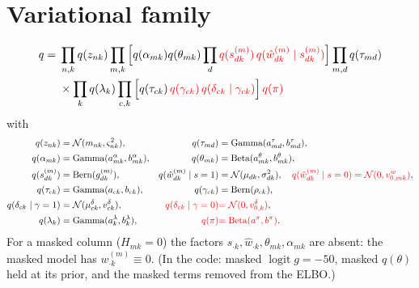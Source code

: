 \documentclass[11pt,a4paper]{article}
\newcommand{\new}[1]{{\color{red}#1}}
\newcommand{\N}{\mathcal{N}}
\newcommand{\Bern}{\mathrm{Bern}}
\newcommand{\Betad}{\mathrm{Beta}}
\newcommand{\Gam}{\mathrm{Gamma}}
\newcommand{\logit}{\operatorname{logit}}
\newcommand{\wh}{\hat w}
\theoremstyle{definition}
\theoremstyle{remark}
\begin{document}
\section{Variational family}\label{sec:q}
\begin{equation}\label{eq:q}
\begin{split}
q={}&\prod_{n,k}q(z_{nk})\prod_{m,k}\Big[q(\alpha_{mk})q(\theta_{mk})\prod_d \new{q(s^{(m)}_{dk})\,q(\wh^{(m)}_{dk}\mid s^{(m)}_{dk})}\Big]\prod_{m,d}q(\tau_{md})\\
&\times\prod_{k}q(\lambda_k)\prod_{c,k}\Big[q(\tau_{ck})\,\new{q(\gamma_{ck})\,q(\delta_{ck}\mid\gamma_{ck})}\Big]\,\new{q(\pi)}
\end{split}
\end{equation}
with
\begin{align*}
q(z_{nk})&=\N(m_{nk},\varsigma^2_{nk}), & q(\tau_{md})&=\Gam(a^\tau_{md},b^\tau_{md}),\\
q(\alpha_{mk})&=\Gam(a^\alpha_{mk},b^\alpha_{mk}), & q(\theta_{mk})&=\Betad(a^\theta_{mk},b^\theta_{mk}),\\
q(s^{(m)}_{dk})&=\Bern(g^{(m)}_{dk}), & q(\wh^{(m)}_{dk}\mid s=1)&=\N(\mu_{dk},\sigma^2_{dk}),\quad \new{q(\wh^{(m)}_{dk}\mid s=0)=\N(0,v^{w}_{0,mk})},\\
q(\tau_{ck})&=\Gam(a_{ck},b_{ck}), & q(\gamma_{ck})&=\Bern(\rho_{ck}),\\
q(\delta_{ck}\mid\gamma=1)&=\N(\mu^\delta_{ck},v^\delta_{ck}), & \new{q(\delta_{ck}\mid\gamma=0)}&\new{=\N(0,v^\delta_{0,k})},\\
q(\lambda_k)&=\Gam(a^\lambda_k,b^\lambda_k), & \new{q(\pi)}&\new{=\Betad(a^\pi,b^\pi)}.
\end{align*}
For a masked column ($H_{mk}=0$) the factors $s_{\cdot k},\wh_{\cdot k},\theta_{mk},\alpha_{mk}$ are absent: the masked model has
$w^{(m)}_{\cdot k}\equiv0$. (In the code: masked $\logit g=-50$, masked $q(\theta)$ held at its prior, and the masked terms
removed from the ELBO.)
\end{document}
